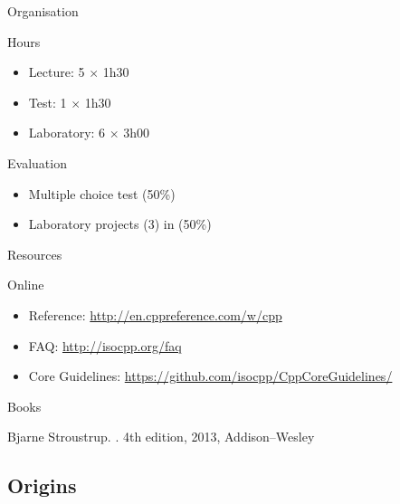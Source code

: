 \begin{frame}{Organisation}{}
  \begin{block}{Hours}
    \begin{itemize}
    \item
      Lecture: 5 $\times$ 1h30
    \item
      Test: 1 $\times$ 1h30
    \item
      Laboratory: 6 $\times$ 3h00
    \end{itemize}
  \end{block}

  \begin{block}{Evaluation}
    \begin{itemize}
    \item
      Multiple choice test (50\%)
    \item
      Laboratory projects (3) in \CCLang (50\%)
    \end{itemize}
  \end{block}
\end{frame}

\begin{frame}{Resources}{}
  \begin{block}{Online}
    \begin{itemize}
    \item
      \CCLang Reference: \url{http://en.cppreference.com/w/cpp}
    \item
      \CCLang FAQ: \url{http://isocpp.org/faq}
    \item
      \CCLang Core Guidelines: \url{https://github.com/isocpp/CppCoreGuidelines/}
    \end{itemize}
  \end{block}

  \begin{block}{Books}
    \begin{thebibliography}{}
      Bjarne Stroustrup.
      .
      \newblock 4th edition, 2013, Addison--Wesley
    \end{thebibliography}
  \end{block}
\end{frame}

\subsection{\CCLang Origins}


